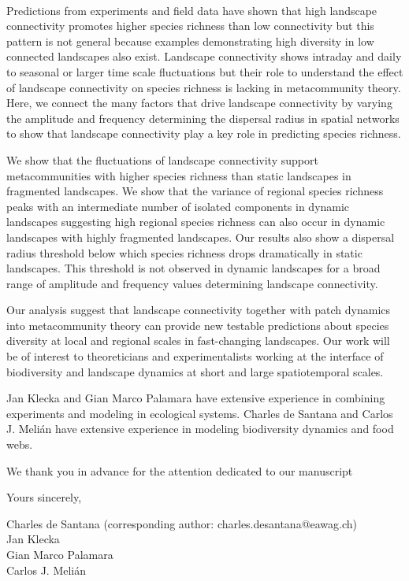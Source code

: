 \documentclass[12pt]{article}
\begin{document}
\\

Predictions from experiments and field data have shown that high landscape connectivity promotes higher species richness than low connectivity but this pattern is not general because examples demonstrating high diversity in low connected landscapes also exist. Landscape connectivity shows intraday and daily to seasonal or larger time scale fluctuations but their role to understand the effect of landscape connectivity on species richness is lacking in metacommunity theory. Here, we connect the many factors that drive landscape connectivity by varying the amplitude and frequency determining the dispersal radius in spatial networks to show that landscape connectivity play a key role in predicting species richness. 

We show that the fluctuations of landscape connectivity support metacommunities with higher species richness than static landscapes in fragmented landscapes. We show that the variance of regional species richness peaks with an intermediate number of isolated components in dynamic landscapes suggesting high regional species richness can also occur in dynamic landscapes with highly fragmented landscapes. Our results also show a dispersal radius threshold below which species richness drops dramatically in static landscapes. This threshold is not observed in dynamic landscapes for a broad range of amplitude and frequency values determining landscape connectivity.

Our analysis suggest that landscape connectivity together with patch dynamics into metacommunity theory can provide new testable predictions about species diversity at local and regional scales in fast-changing landscapes. Our work will be of interest to theoreticians and experimentalists working at the interface of biodiversity and landscape dynamics at short and large spatiotemporal scales.

Jan Klecka and Gian Marco Palamara have extensive experience in combining experiments and modeling in ecological systems. Charles de Santana and Carlos J. Meli\'an have extensive experience in modeling biodiversity dynamics and food webs.

We thank you in advance for the attention dedicated to our manuscript

Yours sincerely,
\vspace{0.1 in}

\noindent Charles de Santana (corresponding author: charles.desantana@eawag.ch)\\
Jan Klecka\\
Gian Marco Palamara\\
Carlos J. Meli\'an\\
\end{document}

